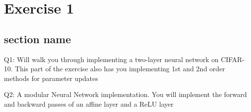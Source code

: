 \graphicspath{{Chapters/Exercise1/}}

\chapter{Exercise 1}

\section{section name} %
\label{sec:section_name}





Q1: Will walk you through implementing a two-layer neural network on CIFAR-10.
This part of the exercise also has you implementing 1st and 2nd order methods for parameter updates

Q2: A modular Neural Network implementation. You will implement the forward and
backward passes of an affine layer and a ReLU layer


